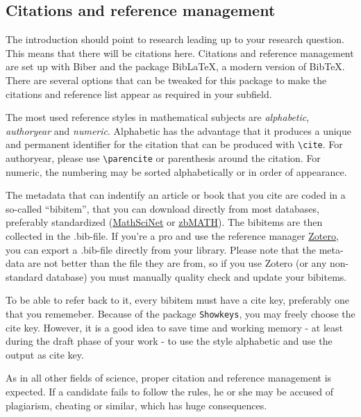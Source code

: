 \subsection{Citations and reference management}
The introduction should point to research leading up to your research question. This means that there will be citations here. Citations and reference management are set up with Biber and the package BibLaTeX, a modern version of BibTeX. There are several options that can be tweaked for this package to make the citations and reference list appear as required in your subfield.

The most used reference styles in mathematical subjects are \emph{alphabetic}, \emph{authoryear} and \emph{numeric}. Alphabetic has the advantage that it produces a unique and permanent identifier for the citation that can be produced with \texttt{\textbackslash cite}. For authoryear, please use \texttt{\textbackslash parencite} or parenthesis around the citation. For numeric, the numbering may be sorted alphabetically or in order of appearance.

The metadata that can indentify an article or book that you cite are coded in a so-called \enquote{bibitem}, that you can download directly from most databases, preferably standardized (\hyperlink{https://mathscinet.ams.org/}{MathSciNet} or \hyperlink{https://zbmath.org/}{zbMATH}). The bibitems are then collected in the .bib-file. If you're a pro and use the reference manager \hyperlink{https://www.zotero.org/}{Zotero}, you can export a .bib-file directly from your library. Please note that the meta-data are not better than the file they are from, so if you use Zotero (or any non-standard database) you must manually quality check and update your bibitems.

To be able to refer back to it, every bibitem must have a cite key, preferably one that you rememeber. Because of the package \texttt{Showkeys}, you may freely choose the cite key. However, it is a good idea to save time and working memory - at least during the draft phase of your work - to use the style alphabetic and use the output as cite key.

As in all other fields of science, proper citation and reference management is expected. If a candidate fails to follow the rules, he or she may be accused of plagiarism, cheating or similar, which has huge consequences.

